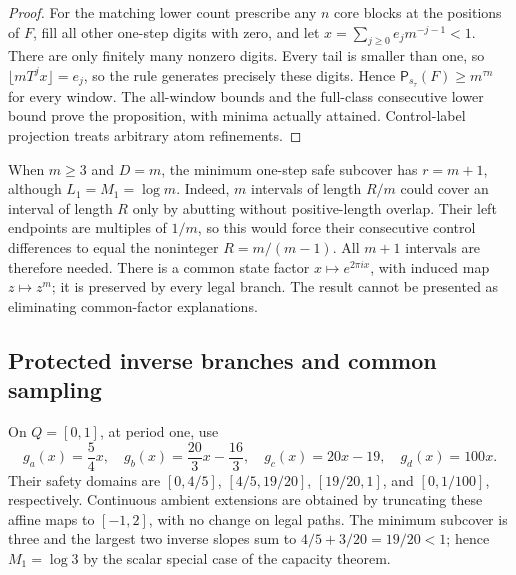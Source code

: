 \documentclass[11pt,reqno]{amsart}
\numberwithin{equation}{section}
\theoremstyle{definition}
\theoremstyle{definition}
\newcommand{\Patt}{\mathsf P}
\begin{document}
\begin{proof}
For the matching lower count prescribe any $n$ core blocks at the
positions of $F$, fill all other one-step digits with zero, and let
$x=\sum_{j\ge0}e_jm^{-j-1}<1$. There are only finitely many
nonzero digits. Every tail is smaller than one, so
$\lfloor mT^jx\rfloor=e_j$, so the rule generates precisely
these digits. Hence $\Patt_{s_\tau}(F)\ge m^{\tau n}$ for every
window. The all-window bounds and the full-class consecutive lower
bound prove the proposition, with minima actually attained.
Control-label projection treats arbitrary atom refinements.
\end{proof}

When $m\ge3$ and $D=m$, the minimum one-step safe subcover has
$r=m+1$, although $L_1=M_1=\log m$. Indeed, $m$ intervals of
length $R/m$ could cover an interval of length $R$ only by abutting
without positive-length overlap. Their left endpoints are multiples
of $1/m$, so this would force their consecutive control differences
to equal the noninteger $R=m/(m-1)$. All $m+1$ intervals are
therefore needed. There is a common state factor
$x\mapsto e^{2\pi ix}$, with induced map $z\mapsto z^m$;
it is preserved by every legal branch. The result cannot be presented
as eliminating common-factor explanations.

\subsection{Protected inverse branches and common sampling}
On $Q=[0,1]$, at period one, use
\[
 g_a(x)=\frac54x,\quad g_b(x)=\frac{20}3x-\frac{16}3,
 \quad g_c(x)=20x-19,\quad g_d(x)=100x.
\]
Their safety domains are
$[0,4/5]$, $[4/5,19/20]$, $[19/20,1]$, and
$[0,1/100]$, respectively. Continuous ambient extensions are
obtained by truncating these affine maps to $[-1,2]$, with no
change on legal paths. The minimum subcover is three and the largest
two inverse slopes sum to $4/5+3/20=19/20<1$; hence
$M_1=\log3$ by the scalar special case of the capacity theorem.
\end{document}
